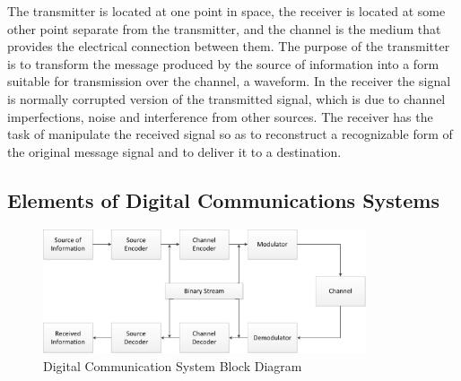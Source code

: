 The transmitter is located at one point in space, the receiver is located at
some other point separate from the transmitter, and the channel is the medium
that provides the electrical connection between them. The purpose of the
transmitter is to transform the message produced by the source of information
into a form suitable for transmission over the channel, a waveform. In the
receiver the signal is normally corrupted version of the transmitted signal,
which is due to channel imperfections, noise and interference from other
sources. The receiver has the task of manipulate the received signal so as to
reconstruct a recognizable form of the original message signal and to deliver it
to a destination.

%
%
%
%
%

\subsection{Elements of Digital Communications Systems}

\begin{figure}[htbp]
    \centering
    \includegraphics[width=0.85\textwidth]{./figures/digicom_bd}
    \caption{ Digital Communication System Block Diagram
    \label{fig:digcombd}}
\end{figure}

